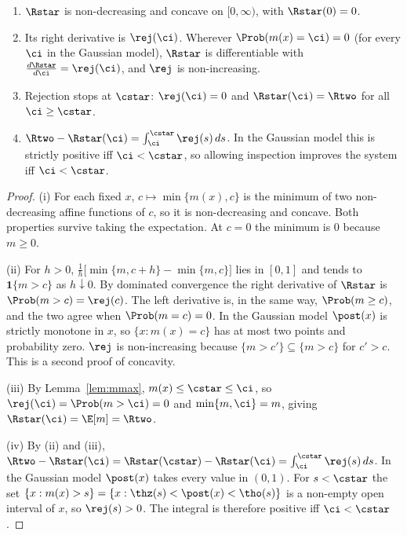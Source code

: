 \begin{proposition}\label{prop:risk-ci}
\begin{enumerate}[label=(\roman*),itemsep=1pt]
  \item $\Rstar$ is non-decreasing and concave on $[0,\infty)$, with $\Rstar(0)=0$.
  \item Its right derivative is $\rej(\ci)$. Wherever $\Prob(m(x)=\ci)=0$ (for every $\ci$ in the Gaussian
        model), $\Rstar$ is differentiable with $\frac{d\Rstar}{d\ci} = \rej(\ci)$, and $\rej$ is
        non-increasing.
  \item Rejection stops at $\cstar$: $\rej(\ci)=0$ and $\Rstar(\ci)=\Rtwo$ for all $\ci\ge\cstar$.
  \item $\Rtwo-\Rstar(\ci)=\int_{\ci}^{\cstar}\rej(s)\,ds$. In the Gaussian model this is strictly
        positive iff $\ci<\cstar$, so allowing inspection improves the system iff $\ci<\cstar$.
\end{enumerate}
\end{proposition}

\begin{proof}
(i) For each fixed $x$, $c\mapsto\min\{m(x),c\}$ is the minimum of two non-decreasing affine
functions of $c$, so it is non-decreasing and concave. Both properties survive taking the expectation.
At $c=0$ the minimum is $0$ because $m\ge0$.

(ii) For $h>0$,
$\frac1h\big[\min\{m,c+h\}-\min\{m,c\}\big]$ lies in $[0,1]$ and tends to $\mathbf 1\{m>c\}$ as
$h\downarrow0$. By dominated convergence the right derivative of $\Rstar$ is $\Prob(m>c)=\rej(c)$.
The left derivative is, in the same way, $\Prob(m\ge c)$, and the two agree when $\Prob(m=c)=0$.
In the Gaussian model $\post(x)$ is strictly monotone in $x$, so $\{x: m(x)=c\}$ has at most
two points and probability zero. $\rej$ is non-increasing because $\{m>c'\}\subseteq\{m>c\}$ for
$c'>c$. This is a second proof of concavity.

(iii) By Lemma~\ref{lem:mmax}, $m(x)\le\cstar\le\ci$, so $\rej(\ci)=\Prob(m>\ci)=0$ and
$\min\{m,\ci\}=m$, giving $\Rstar(\ci)=\E[m]=\Rtwo$.

(iv) By (ii) and (iii), $\Rtwo-\Rstar(\ci)=\Rstar(\cstar)-\Rstar(\ci)=\int_{\ci}^{\cstar}\rej(s)\,ds$.
In the Gaussian model $\post(x)$ takes every value in $(0,1)$. For $s<\cstar$ the set
$\{x: m(x)>s\}=\{x:\thz(s)<\post(x)<\tho(s)\}$ is a non-empty open interval of $x$, so
$\rej(s)>0$. The integral is therefore positive iff $\ci<\cstar$.
\end{proof}

